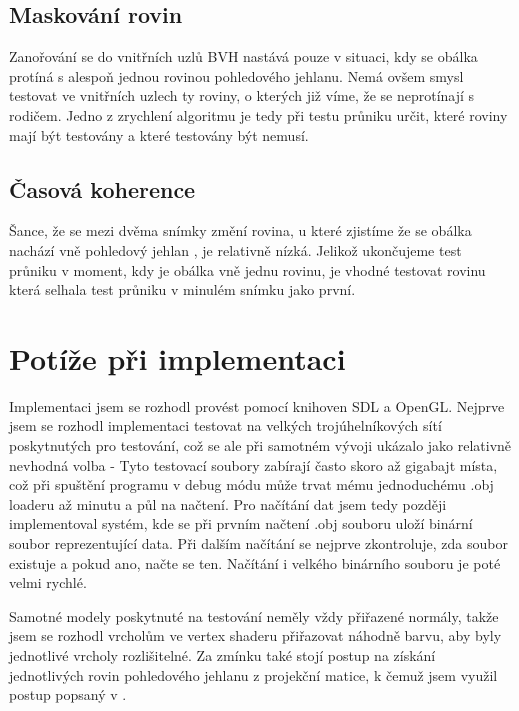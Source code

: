 \documentclass[report,11pt]{elsarticle}
\begin{document}
\subsection{Maskování rovin}

Zanořování se do vnitřních uzlů BVH nastává pouze v situaci, kdy se obálka
protíná s alespoň jednou rovinou pohledového jehlanu. Nemá ovšem smysl testovat
ve vnitřních uzlech ty roviny, o kterých již víme, že se neprotínají s rodičem.
Jedno z zrychlení algoritmu je tedy při testu průniku určit, které roviny mají
být testovány a které testovány být nemusí.



\subsection{Časová koherence}

Šance, že se mezi dvěma snímky změní rovina, u které zjistíme že se obálka
nachází vně pohledový jehlan , je relativně nízká. Jelikož ukončujeme test
průniku v moment, kdy je obálka vně jednu rovinu, je vhodné testovat rovinu která
selhala test průniku v minulém snímku jako první.

\section{\label{SEC:Pitfalls}Potíže při implementaci}

Implementaci jsem se rozhodl provést pomocí knihoven SDL a OpenGL. Nejprve jsem
se rozhodl implementaci testovat na velkých trojúhelníkových sítí poskytnutých
pro testování, což se ale při samotném vývoji ukázalo jako relativně nevhodná
volba - Tyto testovací soubory zabírají často skoro až gigabajt místa, což při
spuštění programu v debug módu může trvat mému jednoduchému .obj loaderu až
minutu a půl na načtení. Pro načítání dat jsem tedy později implementoval systém, kde
se při prvním načtení .obj souboru uloží binární soubor reprezentující data.
Při dalším načítání se nejprve zkontroluje, zda soubor existuje a pokud ano,
načte se ten. Načítání i velkého binárního souboru je poté velmi rychlé.

Samotné modely poskytnuté na testování neměly vždy přiřazené normály, takže jsem
se rozhodl vrcholům ve vertex shaderu přiřazovat náhodně barvu, aby byly
jednotlivé vrcholy rozlišitelné. Za zmínku také stojí postup na získání
jednotlivých rovin pohledového jehlanu z projekční matice, k čemuž jsem využil
postup popsaný v \cite{gribb2001fast}.
\end{document}
